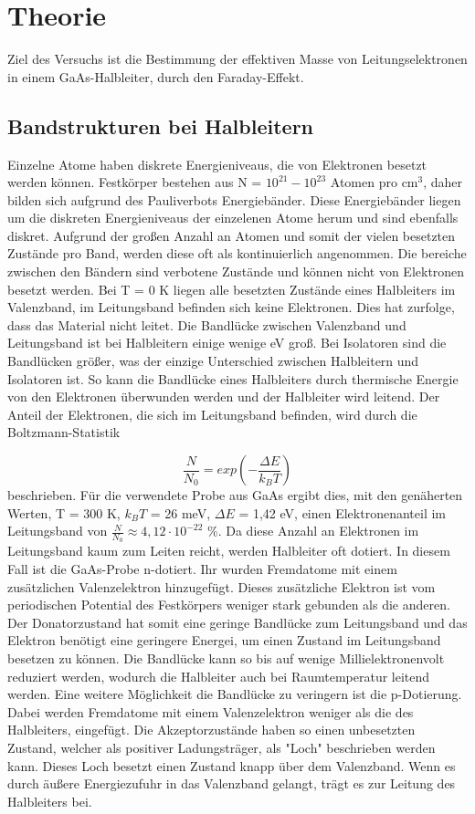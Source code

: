 \section{Theorie}
\label{sec:Theorie}
Ziel des Versuchs ist die Bestimmung der effektiven Masse von Leitungselektronen in einem GaAs-Halbleiter, 
durch den Faraday-Effekt.

\subsection{Bandstrukturen bei Halbleitern}
Einzelne Atome haben diskrete Energieniveaus, die von Elektronen besetzt werden können. 
Festkörper bestehen aus N = $10^{21} - 10^{23}$ Atomen pro cm$^3$, daher bilden sich aufgrund des Pauliverbots Energiebänder.
Diese Energiebänder liegen um die diskreten Energieniveaus der einzelenen Atome herum und sind ebenfalls diskret. 
Aufgrund der großen Anzahl an Atomen und somit der vielen besetzten Zustände pro Band, werden diese oft als kontinuierlich angenommen. 
Die bereiche zwischen den Bändern sind verbotene Zustände und können nicht von Elektronen besetzt werden. 
Bei T = 0 K liegen alle besetzten Zustände eines Halbleiters im Valenzband, im Leitungsband befinden sich keine Elektronen.
Dies hat zurfolge, dass das Material nicht leitet.
Die Bandlücke zwischen Valenzband und Leitungsband ist bei Halbleitern einige wenige eV groß. 
Bei Isolatoren sind die Bandlücken größer, was der einzige Unterschied zwischen Halbleitern und Isolatoren ist.
So kann die Bandlücke eines Halbleiters durch thermische Energie von den Elektronen überwunden werden und der 
Halbleiter wird leitend. Der Anteil der Elektronen, die sich im Leitungsband befinden, wird durch die Boltzmann-Statistik

\begin{equation}
    \frac{N}{N_0} = exp \left(-\frac{\Delta E}{k_B T}\right)
\end{equation} 
beschrieben.
Für die verwendete Probe aus GaAs ergibt dies, mit den genäherten Werten, T = 300 K, $k_B T$ = 26 meV, $\Delta E$ = 1,42 eV, 
einen Elektronenanteil im Leitungsband von $\frac{N}{N_0} \approx 4,12 \cdot 10^{-22}$ \%.
Da diese Anzahl an Elektronen im Leitungsband kaum zum Leiten reicht, werden Halbleiter oft dotiert. 
In diesem Fall ist die GaAs-Probe n-dotiert. Ihr wurden Fremdatome mit einem zusätzlichen Valenzelektron hinzugefügt.
Dieses zusätzliche Elektron ist vom periodischen Potential des Festkörpers weniger stark gebunden als die anderen. 
Der Donatorzustand hat somit eine geringe Bandlücke zum Leitungsband 
und das Elektron benötigt eine geringere Energei, um einen Zustand im Leitungsband besetzen zu können.
Die Bandlücke kann so bis auf wenige Millielektronenvolt reduziert werden, wodurch die Halbleiter auch bei 
Raumtemperatur leitend werden.
Eine weitere Möglichkeit die Bandlücke zu veringern ist die p-Dotierung. 
Dabei werden Fremdatome mit einem Valenzelektron weniger als die des Halbleiters, eingefügt. 
Die Akzeptorzustände haben so einen unbesetzten Zustand, welcher als positiver Ladungsträger, als "Loch" \: beschrieben werden kann. 
Dieses Loch besetzt einen Zustand knapp über dem Valenzband. Wenn es durch äußere Energiezufuhr 
in das Valenzband gelangt, trägt es zur Leitung des Halbleiters bei.

